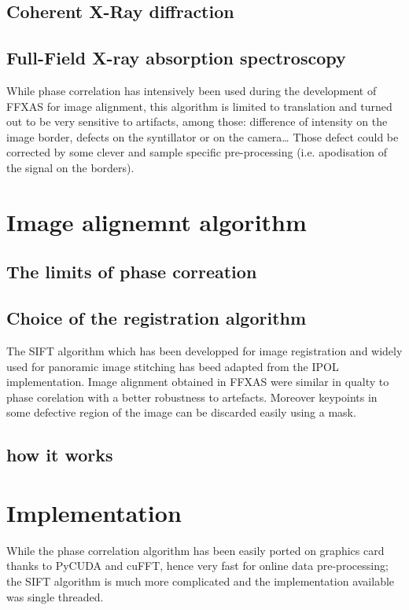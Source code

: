 \documentclass[preprint]{iucr}
\begin{document}
\subsection{Coherent X-Ray diffraction}

\subsection{Full-Field X-ray absorption spectroscopy} 


While phase correlation has intensively been used during the development of
FFXAS for image alignment, this algorithm is limited to translation and turned
out to be very sensitive to artifacts, among those: difference of intensity on
the image border, defects on the syntillator or on the camera\ldots 
Those defect could be corrected by some clever and sample specific
pre-processing (i.e. apodisation of the signal on the borders).


\section{Image alignemnt algorithm}

\subsection{The limits of phase correation} 

\subsection{Choice of the registration algorithm}

The SIFT algorithm \cite{Lowe1999,Lowe2004} which has been developped
for image registration and widely used for panoramic image stitching has beed
adapted from the IPOL\cite{ASIFT} implementation. Image alignment obtained in
FFXAS were similar in qualty to phase corelation with a better robustness to
artefacts. Moreover keypoints in some defective region of the image can be
discarded easily using a mask.


\subsection{how it works}


\section{Implementation}
While the phase correlation algorithm has been easily ported on graphics card
thanks to PyCUDA and cuFFT, hence very fast for online data
pre-processing; 
the SIFT algorithm is much more complicated and the implementation available was
single threaded.
\end{document}
